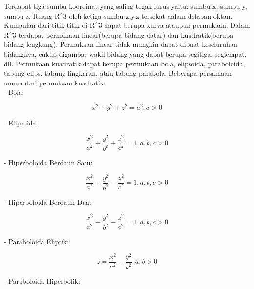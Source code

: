 \documentclass[a4paper,10pt]{article}
\begin{document}
\begin{eulernotebook}
\begin{eulercomment}
\begin{eulercomment}
\begin{eulercomment}
Terdapat tiga sumbu koordinat yang saling tegak lurus yaitu: sumbu x,
sumbu y, sumbu z. Ruang R\textasciicircum{}3 oleh ketiga sumbu x,y,z tersekat dalam
delapan oktan. Kumpulan dari titik-titik di R\textasciicircum{}3 dapat berupa kurva
ataupun permukaan.  Dalam R\textasciicircum{}3 terdapat permukaan linear(berupa bidang
datar) dan kuadratik(berupa bidang lengkung). Permukaan linear tidak
mungkin dapat dibuat keseluruhan bidangnya, cukup digambar wakil
bidang yang dapat berupa segitiga, segiempat, dll. Permukaan kuadratik
dapat berupa permukaan bola, elipsoida, paraboloida, tabung elips,
tabung lingkaran, atau tabung parabola. Beberapa persamaan umum dari
permukaan kuadratik.\\
- Bola:\\
\end{eulercomment}
\begin{eulerformula}
\[
x^2+y^2+z^2=a^2, a>0
\]
\end{eulerformula}
\begin{eulercomment}
- Elipsoida:\\
\end{eulercomment}
\begin{eulerformula}
\[
\frac{x^2}{a^2}+\frac{y^2}{b^2}+\frac{z^2}{c^2}=1, a,b,c>0
\]
\end{eulerformula}
\begin{eulercomment}
- Hiperboloida Berdaun Satu:\\
\end{eulercomment}
\begin{eulerformula}
\[
\frac{x^2}{a^2}+\frac{y^2}{b^2}-\frac{z^2}{c^2}=1, a,b,c>0
\]
\end{eulerformula}
\begin{eulercomment}
- Hiperboloida Berdaun Dua:\\
\end{eulercomment}
\begin{eulerformula}
\[
\frac{x^2}{a^2}-\frac{y^2}{b^2}-\frac{z^2}{c^2}=1, a,b,c>0
\]
\end{eulerformula}
\begin{eulercomment}
- Paraboloida Eliptik:\\
\end{eulercomment}
\begin{eulerformula}
\[
z=\frac{x^2}{a^2}+\frac{y^2}{b^2}, a,b>0
\]
\end{eulerformula}
\begin{eulercomment}
- Paraboloida Hiperbolik:\\
\end{eulercomment}

\end{eulercomment}
\end{eulercomment}
\end{eulernotebook}
\end{document}
